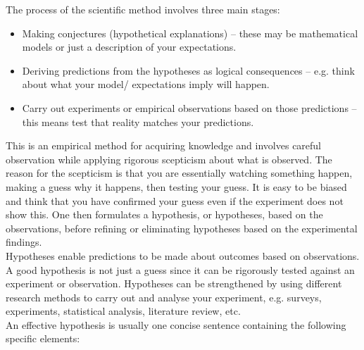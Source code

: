 \documentclass[a4paper,12pt]{book}
\begin{document}
The process of the scientific method involves three main stages:
\begin{itemize}
\setlength{\itemsep}{-5pt}
    \item Making conjectures (hypothetical explanations) -- these may be mathematical models or just a description of your expectations.
    \item Deriving predictions from the hypotheses as logical consequences -- e.g. think about what your model/ expectations imply will happen.
    \item Carry out experiments or empirical observations based on those predictions -- this means test that reality matches your predictions.
\end{itemize}

This is an empirical method for acquiring knowledge and involves careful observation while applying rigorous scepticism about what is observed. The reason for the scepticism is that you are essentially watching something happen, making a guess why it happens, then testing your guess. It is easy to be biased and think that you have confirmed your guess even if the experiment does not show this. One then formulates a hypothesis, or hypotheses, based on the observations, before refining or eliminating hypotheses based on the experimental findings.\\

Hypotheses enable predictions to be made about outcomes based on observations. A good hypothesis is not just a guess since it can be rigorously tested against an experiment or observation. Hypotheses can be strengthened by using different research methods to carry out and analyse your experiment, e.g. surveys, experiments, statistical analysis, literature review, etc.\\

An effective hypothesis is usually one concise sentence containing the following specific elements:
\end{document}

